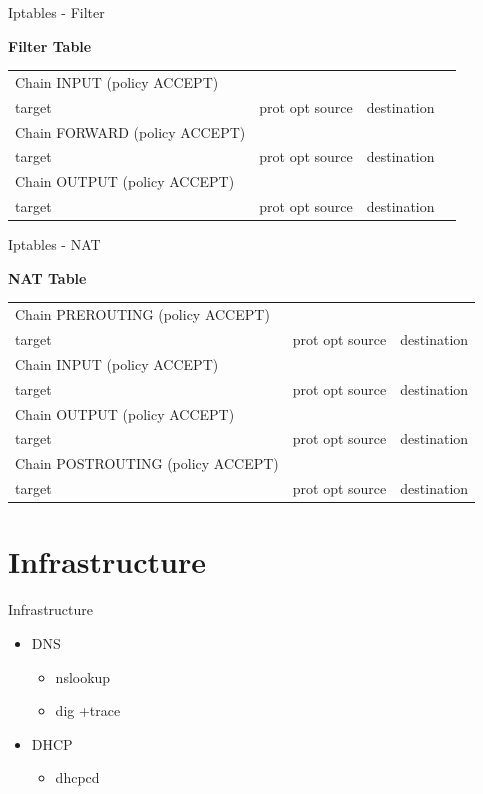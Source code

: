 \documentclass[aspectratio=169,10pt,t]{beamer}
\begin{document}
\begin{frame}[t]{Iptables - Filter}

	\textbf{Filter Table}
	\begin{tabular}{*{4}{l}}
		Chain INPUT (policy ACCEPT)&&&\\
		target&prot opt source&destination&\\

		Chain FORWARD (policy ACCEPT)\\
		target&prot opt source&destination&\\

		Chain OUTPUT (policy ACCEPT)\\
		target&prot opt source&destination&\\
	\end{tabular}

	
\end{frame}
\begin{frame}[t]{Iptables - NAT}

	\textbf{NAT Table}
	\begin{tabular}{*{3}{l}}
		Chain PREROUTING (policy ACCEPT)\\
		target&prot opt source&destination\\

		Chain INPUT (policy ACCEPT)\\
		target&prot opt source&destination\\

		Chain OUTPUT (policy ACCEPT)\\
		target&prot opt source&destination\\

		Chain POSTROUTING (policy ACCEPT)\\
		target&prot opt source&destination
	\end{tabular}
	
\end{frame}

\section{Infrastructure}%
\label{sec:routing}


\begin{frame}[t]{Infrastructure}
	\begin{itemize}
		\item DNS
			\begin{itemize}
				\item nslookup
				\item dig +trace
			\end{itemize}
		\item DHCP
			\begin{itemize}
				\item dhcpcd
			\end{itemize}
	\end{itemize}
\end{frame}
\end{document}
